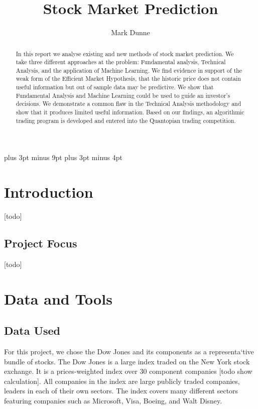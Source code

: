 \documentclass{report}
\title{Stock Market Prediction}
\author{Mark Dunne}
\begin{document}
\lstset{language=Python}    
\linespread{1.3}
\belowdisplayskip=12pt plus 3pt minus 9pt
\belowdisplayshortskip=7pt plus 3pt minus 4pt

\maketitle

\begin{abstract}

In this report we analyse existing and new methods of stock market prediction. We take three different approaches at the problem: Fundamental analysis, Technical Analysis, and the application of Machine Learning. We find evidence in support of the weak form of the Efficient Market Hypothesis, that the historic price does not contain useful information but out of sample data may be predictive. We show that Fundamental Analysis and Machine Learning could be used to guide an investor's decisions. We demonstrate a common flaw in the Technical Analysis methodology and show that it produces limited useful information. Based on our findings, an algorithmic trading program is developed and entered into the Quantopian trading competition.

\end{abstract}

\tableofcontents

\chapter{Introduction}

[todo]

\section{Project Focus}

[todo]

\chapter{Data and Tools}

\section{Data Used}

For this project, we chose the Dow Jones and its components as a representa`tive bundle of stocks. The Dow Jones is a large index traded on the New York stock exchange. It is a prices-weighted index over 30 component companies [todo show calculation]. All companies in the index are large publicly traded companies, leaders in each of their own sectors. The index covers many different sectors featuring companies such as Microsoft, Visa, Boeing, and Walt Disney.
\end{document}
